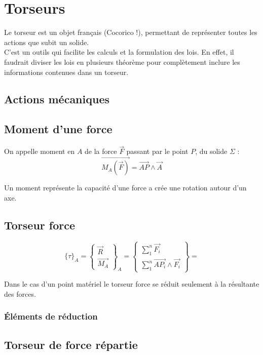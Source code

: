 \chapter{Torseurs}
Le torseur est un objet français (Cocorico !), permettant de représenter toutes les actions que subit un solide.\\
C'est un outils qui facilite les calculs et la formulation des lois.
En effet, il faudrait diviser les lois en plusieurs théorème pour complètement inclure les informations contenues dans un torseur.
\section{Actions mécaniques}
\section{Moment d'une force}
\begin{defi}
On appelle moment en $A$ de la force $\overrightarrow{F}$ passant par le point $P$, du solide $\Sigma$ :
$$\overrightarrow{M_{A}(\overrightarrow{F})}=\overrightarrow{AP}\land\overrightarrow{A}$$
\end{defi}
Un moment représente la capacité d'une force a crée une rotation autour d'un axe.
\section{Torseur force}
\begin{defi}

$$\{\tau\}_{A}=\left\{\begin{array}{c}\overrightarrow{R}\\\overrightarrow{M_A}\end{array}\right\}_A=\left\{\begin{array}{c} \sum_{1}^{n}\overrightarrow{F_i}\\\sum_{1}^{n}\overrightarrow{AP_i}\land\overrightarrow{F_i}\end{array}\right\}=$$
\end{defi}
\begin{rmq}
Dans le cas d'un point matériel le torseur force se réduit seulement à la résultante des forces.
\end{rmq}
\subsection{Éléments de réduction}
\section{Torseur de force répartie}
